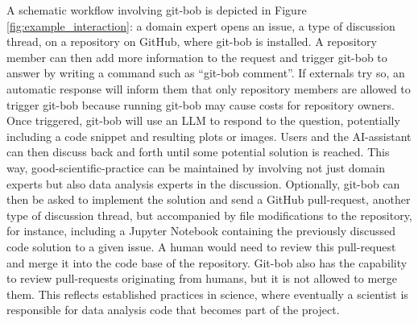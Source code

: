 \documentclass[sn-mathphys-num]{sn-jnl}%
\theoremstyle{thmstyleone}%
\theoremstyle{thmstyletwo}%
\theoremstyle{thmstylethree}%
\begin{document}
A schematic workflow involving git-bob is depicted in Figure \ref{fig:example_interaction}: a domain expert opens an issue, a type of discussion thread, on a repository on GitHub, where git-bob is installed. A repository member can then add more information to the request and trigger git-bob to answer by writing a command such as ``git-bob comment''. If externals try so, an automatic response will inform them that only repository members are allowed to trigger git-bob because running git-bob may cause costs for repository owners. Once triggered, git-bob will use an LLM to respond to the question, potentially including a code snippet and resulting plots or images. Users and the AI-assistant can then discuss back and forth until some potential solution is reached. This way, good-scientific-practice can be maintained by involving not just domain experts but also data analysis experts in the discussion. Optionally, git-bob can then be asked to implement the solution and send a GitHub pull-request, another type of discussion thread, but accompanied by file modifications to the repository, for instance, including a Jupyter Notebook containing the previously discussed code solution to a given issue. A human would need to review this pull-request and merge it into the code base of the repository. Git-bob also has the capability to review pull-requests originating from humans, but it is not allowed to merge them. This reflects established practices in science, where eventually a scientist is responsible for data analysis code that becomes part of the project. 
\end{document}
